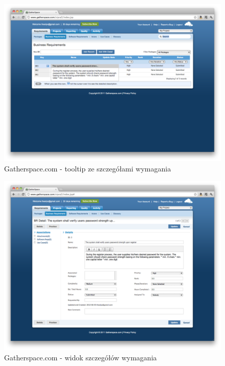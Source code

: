       \begin{figure}[t]
        \centering
        \includegraphics[width=1.0\textwidth]{img/gatherspace_6.pdf}
        \caption{Gatherspace.com - tooltip ze szczegółami wymagania}
        \label{fig:gatherspace_6}
      \end{figure}

      \begin{figure}[t]
        \centering
        \includegraphics[width=1.0\textwidth]{img/gatherspace_7.pdf}
        \caption{Gatherspace.com - widok szczegółów wymagania}
        \label{fig:gatherspace_7}
      \end{figure}


